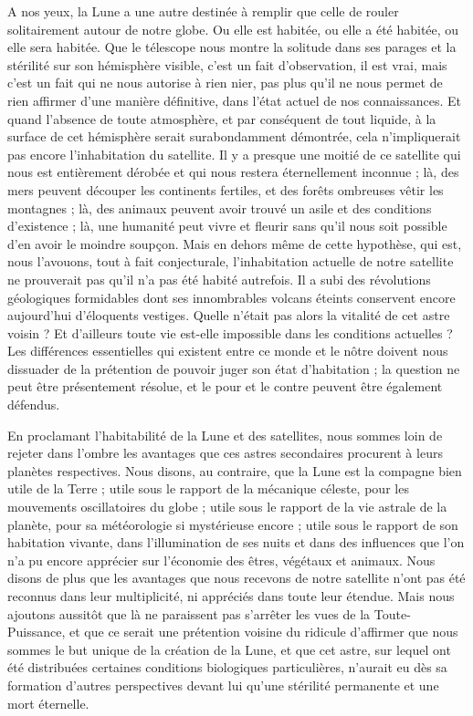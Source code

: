 \documentclass[a4paper, 11pt, oneside]{article}
\begin{document}
A nos yeux, la Lune a une autre destinée à remplir que celle de rouler solitairement autour de notre globe. Ou elle est habitée, ou elle a été habitée, ou elle sera habitée. Que le télescope nous montre la solitude dans ses parages et la stérilité sur son hémisphère visible, c'est un fait d'observation, il est vrai, mais c'est un fait qui ne nous autorise à rien nier, pas plus qu'il ne nous permet de rien affirmer d'une manière définitive, dans l'état actuel de nos connaissances. Et quand l'absence de toute atmosphère, et par conséquent de tout liquide, à la surface de cet hémisphère serait surabondamment démontrée, cela n'impliquerait pas encore l'inhabitation du satellite. Il y a presque une moitié de ce satellite qui nous est entièrement dérobée et qui nous restera éternellement inconnue ; là, des mers peuvent découper les continents fertiles, et des forêts ombreuses vêtir les montagnes ; là, des animaux peuvent avoir trouvé un asile et des conditions d'existence ; là, une humanité peut vivre et fleurir sans qu'il nous soit possible d'en avoir le moindre soupçon. Mais en dehors même de cette hypothèse, qui est, nous l'avouons, tout à fait conjecturale, l'inhabitation actuelle de notre satellite ne prouverait pas qu'il n'a pas été habité autrefois. Il a subi des révolutions géologiques formidables dont ses innombrables volcans éteints conservent encore aujourd'hui d'éloquents vestiges. Quelle n'était pas alors la vitalité de cet astre voisin ? Et d'ailleurs toute vie est-elle impossible dans les conditions actuelles ? Les différences essentielles qui existent entre ce monde et le nôtre doivent nous dissuader de la prétention de pouvoir juger son état d'habitation ; la question ne peut être présentement résolue, et le pour et le contre peuvent être également défendus.

En proclamant l'habitabilité de la Lune et des satellites, nous sommes loin de rejeter dans l'ombre les avantages que ces astres secondaires procurent à leurs planètes respectives. Nous disons, au contraire, que la Lune est la compagne bien utile de la Terre ; utile sous le rapport de la mécanique céleste, pour les mouvements oscillatoires du globe ; utile sous le rapport de la vie astrale de la planète, pour sa météorologie si mystérieuse encore ; utile sous le rapport de son habitation vivante, dans l'illumination de ses nuits et dans des influences que l'on n'a pu encore apprécier sur l'économie des êtres, végétaux et animaux. Nous disons de plus que les avantages que nous recevons de notre satellite n'ont pas été reconnus dans leur multiplicité, ni appréciés dans toute leur étendue. Mais nous ajoutons aussitôt que là ne paraissent pas s'arrêter les vues de la Toute-Puissance, et que ce serait une prétention voisine du ridicule d'affirmer que nous sommes le but unique de la création de la Lune, et que cet astre, sur lequel ont été distribuées certaines conditions biologiques particulières, n'aurait eu dès sa formation d'autres perspectives devant lui qu'une stérilité permanente et une mort éternelle.
\end{document}
